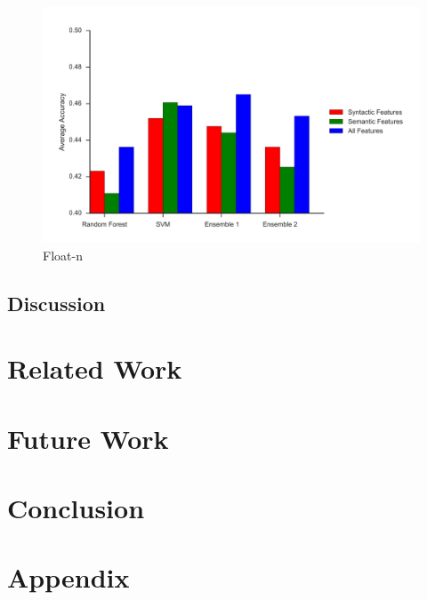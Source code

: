 \documentclass[12pt]{article}
\begin{document}
\begin{figure}[h!]
\caption{Float-n}
\centering
\includegraphics[width=1.0\textwidth]{../graphics/plots/float-v.png}
\end{figure}
\FloatBarrier


\subsection{Discussion}




\section{Related Work}




\section{Future Work}




\section{Conclusion}



\newpage
\section{Appendix}
\end{document}
